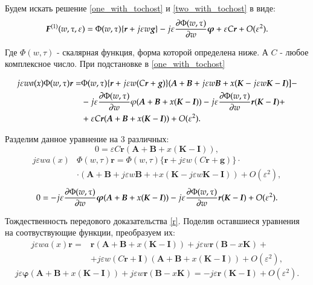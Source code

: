 Будем искать решение \eqref{one_with_tochost} и \eqref{two_with_tochost} в виде:
\begin{align}\label{zamena_phi}
	\boldsymbol{F}^{(1)}(w, \tau , \varepsilon) = \Phi (w, \tau)\{\boldsymbol{r}+j\varepsilon w \boldsymbol{g}\} 
	-j \varepsilon \pdv{\Phi (w, \tau)}{w}\boldsymbol{\varphi} + \varepsilon C \boldsymbol{r} + O(\varepsilon ^2).
\end{align}

Где \(\Phi (w, \tau)\) - скалярная функция, форма которой определена ниже. А \(C\) - любое комплексное число. При подстановке в \eqref{one_with_tochost}

\begin{align*}
	j \varepsilon w a(x) \Phi (w, \tau) \boldsymbol{r} =& \Phi (w, \tau) \{\boldsymbol{r} + j \varepsilon w (C\boldsymbol{r}+\boldsymbol{g})\} 
	(\boldsymbol{A}+\boldsymbol{B} + j\varepsilon w \boldsymbol{B}+x(\boldsymbol{K} - j \varepsilon w\boldsymbol{K}- \boldsymbol{I})]-\\
	&-j\varepsilon \pdv{\Phi (w, \tau)}{w}\varphi (\boldsymbol{A}+\boldsymbol{B} + x(\boldsymbol{K}-\boldsymbol{I}))
	-j\varepsilon \pdv{\Phi (w, \tau)}{w} \boldsymbol{r} (\boldsymbol{K} - \boldsymbol{I})+\\
	&+\varepsilon C \boldsymbol{r} ( \boldsymbol{A}+\boldsymbol{B}+x(\boldsymbol{K}-\boldsymbol{I})) + O(\varepsilon ^2).
\end{align*}

Разделим данное уравнение на 3 различных:
\[ 0 = \varepsilon C \boldsymbol{r}( \boldsymbol{A}+\boldsymbol{B}+x(\boldsymbol{K}-\boldsymbol{I})),\]
\begin{align*}
	j \varepsilon w a(x) &\Phi (w, \tau)\boldsymbol{r} = 
    \Phi (w, \tau) \{\boldsymbol{r} + j \varepsilon w (C\boldsymbol{r}+\boldsymbol{g})\}\cdot \\ 
	&\cdot (\boldsymbol{A}+\boldsymbol{B} + j\varepsilon w \boldsymbol{B}+
	+x(\boldsymbol{K} - j \varepsilon w\boldsymbol{K}- \boldsymbol{I})) + O(\varepsilon ^2),
\end{align*}
\[ 0 = -j\varepsilon \pdv{\Phi (w, \tau)}{w}\boldsymbol{\varphi} (\boldsymbol{A}+\boldsymbol{B} + x(\boldsymbol{K}-\boldsymbol{I}))
-j\varepsilon \pdv{\Phi (w, \tau)}{w} \boldsymbol{r} (\boldsymbol{K} - \boldsymbol{I})+ O(\varepsilon ^2).\]

Тождественность передового доказательства \eqref{r}. Поделив оставшиеся уравнения на соотвуствующие функции, преобразуем их:
\begin{align*}
	j \varepsilon w a(x)\boldsymbol{r}=&\boldsymbol{r}(\boldsymbol{A}+\boldsymbol{B} + x(\boldsymbol{K}-\boldsymbol{I}))+j \varepsilon w \boldsymbol{r}(\boldsymbol{B}-x\boldsymbol{K})+\\
	&+j \varepsilon w (C\boldsymbol{r}+\boldsymbol{I})(\boldsymbol{A}+\boldsymbol{B} + x(\boldsymbol{K}-\boldsymbol{I}))+ O(\varepsilon ^2),
\end{align*}
\[j\varepsilon\boldsymbol{\varphi}(\boldsymbol{A}+\boldsymbol{B} + x(\boldsymbol{K}-\boldsymbol{I}))+j \varepsilon w \boldsymbol{r}(\boldsymbol{B}-x\boldsymbol{K}) = -j\varepsilon\boldsymbol{r}(\boldsymbol{K}-\boldsymbol{I}) + O(\varepsilon ^2).\]

